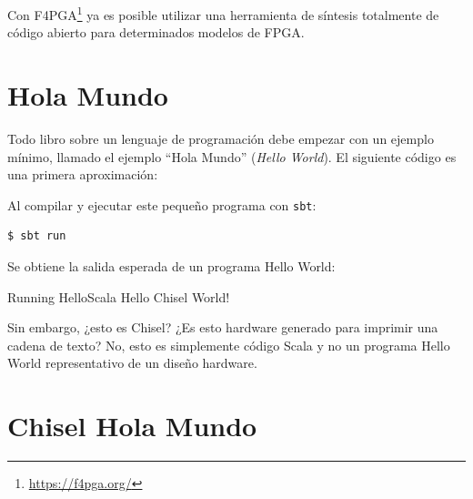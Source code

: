 \documentclass[%
    10pt,
    headinclude, footinclude=false,
    openright, %
    notitlepage,
    cleardoublepage=empty,
    headsepline,
    numbers=noenddot,
    bibliography=totoc, index=totoc,
    ]{scrbook}
\newcommand{\code}[1]{{\lstinline[basicstyle=\small\ttfamily]{#1}}}
\newcommand{\myref}[2]{\href{#1}{#2}}
\renewcommand{\myref}[2]{{#2}{\footnote{\url{#1}}}}
\begin{document}

Con \myref{https://f4pga.org/}{F4PGA} ya es posible utilizar una herramienta de síntesis totalmente de código abierto
para determinados modelos de FPGA.

\section{Hola Mundo}


Todo libro sobre un lenguaje de programación debe empezar con un ejemplo mínimo,
llamado el ejemplo ``Hola Mundo'' (\emph{Hello World}). El siguiente código es una primera aproximación:



\noindent Al compilar y ejecutar este pequeño programa con \code{sbt}:

\begin{verbatim}
$ sbt run
\end{verbatim}


\noindent Se obtiene la salida esperada de un programa Hello World:

\begin{chisel}
[info] Running HelloScala
Hello Chisel World!
\end{chisel}


\noindent Sin embargo, ¿esto es Chisel? ¿Es esto hardware generado para imprimir una cadena de texto?
No, esto es simplemente código Scala y no un programa Hello World representativo de un diseño hardware.

\section{Chisel Hola Mundo}

\end{document}
